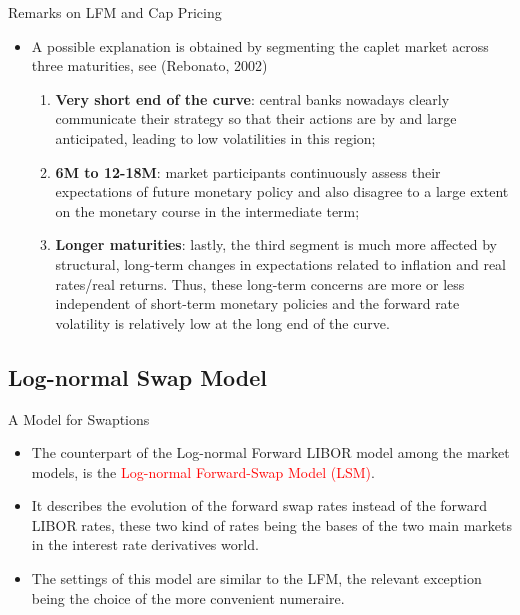 \documentclass{beamer}
\begin{document}
\begin{frame}{Remarks on LFM and Cap Pricing}
	\begin{itemize}
	\item<1-> A possible explanation is obtained by segmenting the caplet market across three maturities, see (Rebonato, 2002)
	\begin{enumerate} 
	\item<2-> \textbf{Very short end of the curve}: central banks nowadays clearly communicate their strategy so that their actions are by and large anticipated, leading to low volatilities in this region;
	\item<3-> \textbf{6M to 12-18M}: market participants continuously assess their expectations of future monetary policy and also disagree to a large extent on the monetary course in
	the intermediate term;
	\item<4-> \textbf{Longer maturities}: lastly, the third segment is much more affected by structural, long-term
	changes in expectations related to inflation and real rates/real returns. Thus, these long-term concerns are more or less independent of short-term monetary policies and the forward rate volatility is relatively low at the long end of the curve.
	\end{enumerate}	
	\end{itemize}
\end{frame}

\subsection{Log-normal Swap Model}
\begin{frame}{A Model for Swaptions}
  \begin{itemize}
  \item<1-> The counterpart of the Log-normal Forward LIBOR model among the market models, is the \textcolor{red}{Log-normal Forward-Swap Model (LSM)}.
  \item<2-> It describes the evolution of the forward swap rates instead of the forward LIBOR rates, these two kind of rates being the bases of the two main markets in the interest rate derivatives world. 
  \item<3-> The settings of this model are similar to the LFM, the relevant exception being the choice of the more convenient numeraire.
  \end{itemize}
\end{frame}
\end{document}
